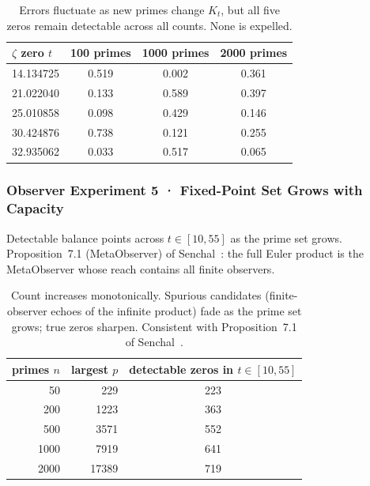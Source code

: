 \documentclass[12pt,a4paper]{article}
\theoremstyle{definition}
\theoremstyle{remark}
\begin{document}
\begin{table}[ht]
\centering
\begin{tabular}{lccc}
\hline
$\zeta$ zero $t$ & 100 primes & 1000 primes & 2000 primes \\
\hline
14.134725 & 0.519 & 0.002 & 0.361 \\
21.022040 & 0.133 & 0.589 & 0.397 \\
25.010858 & 0.098 & 0.429 & 0.146 \\
30.424876 & 0.738 & 0.121 & 0.255 \\
32.935062 & 0.033 & 0.517 & 0.065 \\
\hline
\end{tabular}
\caption{Errors fluctuate as new primes change $K_t$, but all five zeros
remain detectable across all counts.  None is expelled.}
\label{tab:obs:exp4}
\end{table}

\subsubsection{Observer Experiment 5 · Fixed-Point Set Grows with Capacity}
\label{obs:exp5}

Detectable balance points across $t \in [10, 55]$ as the prime set grows.
Proposition~7.1 (MetaObserver) of Senchal~\cite{senchal2026}: the full Euler
product is the MetaObserver whose reach contains all finite observers.

\begin{table}[ht]
\centering
\begin{tabular}{rrc}
\hline
primes $n$ & largest $p$ & detectable zeros in $t \in [10,55]$ \\
\hline
   50 &   229 & 223 \\
  200 &  1223 & 363 \\
  500 &  3571 & 552 \\
 1000 &  7919 & 641 \\
 2000 & 17389 & 719 \\
\hline
\end{tabular}
\caption{Count increases monotonically.  Spurious candidates (finite-observer
echoes of the infinite product) fade as the prime set grows; true zeros
sharpen.  Consistent with Proposition~7.1 of Senchal~\cite{senchal2026}.}
\label{tab:obs:exp5}
\end{table}
\end{document}

